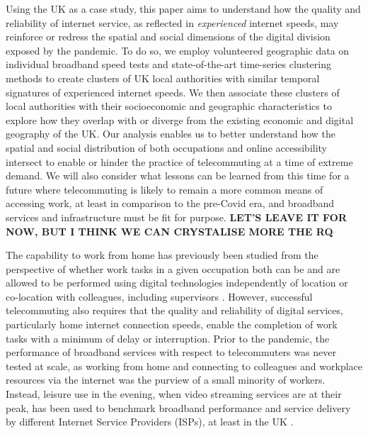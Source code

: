 \documentclass[Royal,times,sageh]{sagej}
\begin{document}
Using the UK as a case study, this paper aims to understand how the
quality and reliability of internet service, as reflected in
\emph{experienced} internet speeds, may reinforce or redress the spatial
and social dimensions of the digital division exposed by the pandemic.
To do so, we employ volunteered geographic data on individual broadband
speed tests and state-of-the-art time-series clustering methods to
create clusters of UK local authorities with similar temporal signatures
of experienced internet speeds. We then associate these clusters of
local authorities with their socioeconomic and geographic
characteristics to explore how they overlap with or diverge from the
existing economic and digital geography of the UK. Our analysis enables
us to better understand how the spatial and social distribution of both
occupations and online accessibility intersect to enable or hinder the
practice of telecommuting at a time of extreme demand. We will also
consider what lessons can be learned from this time for a future where
telecommuting is likely to remain a more common means of accessing work,
at least in comparison to the pre-Covid era, and broadband services and
infrastructure must be fit for purpose. \textbf{LET'S LEAVE IT FOR NOW,
BUT I THINK WE CAN CRYSTALISE MORE THE RQ}

The capability to work from home has previously been studied from the
perspective of whether work tasks in a given occupation both can be and
are allowed to be performed using digital technologies independently of
location or co-location with colleagues, including supervisors
\citep{allen2015effective, singh2013modeling}. However, successful
telecommuting also requires that the quality and reliability of digital
services, particularly home internet connection speeds, enable the
completion of work tasks with a minimum of delay or interruption. Prior
to the pandemic, the performance of broadband services with respect to
telecommuters was never tested at scale, as working from home and
connecting to colleagues and workplace resources via the internet was
the purview of a small minority of workers. Instead, leisure use in the
evening, when video streaming services are at their peak, has been used
to benchmark broadband performance and service delivery by different
Internet Service Providers (ISPs), at least in the UK \citep{ofcom2017}.
\end{document}
